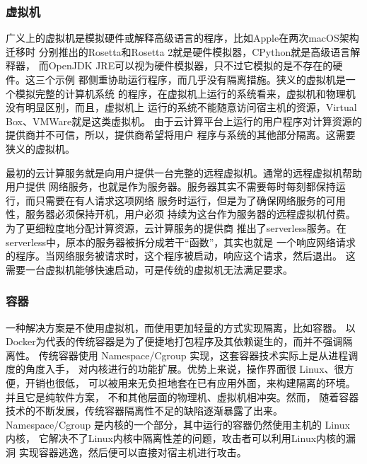 \documentclass{../runikraft-report}
\begin{document}
\subsubsection{虚拟机}
广义上的虚拟机是模拟硬件或解释高级语言的程序，比如Apple在两次macOS架构迁移时
分别推出的Rosetta和Rosetta 2就是硬件模拟器，CPython就是高级语言解释器，
而OpenJDK JRE可以视为硬件模拟器，只不过它模拟的是不存在的硬件。这三个示例
都侧重协助运行程序，而几乎没有隔离措施。狭义的虚拟机是一个模拟完整的计算机系统
的程序，在虚拟机上运行的系统看来，虚拟机和物理机没有明显区别，而且，虚拟机上
运行的系统不能随意访问宿主机的资源，Virtual Box、VMWare就是这类虚拟机。
由于云计算平台上运行的用户程序对计算资源的提供商并不可信，所以，提供商希望将用户
程序与系统的其他部分隔离。这需要狭义的虚拟机。

最初的云计算服务就是向用户提供一台完整的远程虚拟机。通常的远程虚拟机帮助用户提供
网络服务，也就是作为服务器。服务器其实不需要每时每刻都保持运行，而只需要在有人请求这项网络
服务时运行，但是为了确保网络服务的可用性，服务器必须保持开机，用户必须
持续为这台作为服务器的远程虚拟机付费。为了更细粒度地分配计算资源，云计算服务的提供商
推出了serverless服务。在serverless中，原本的服务器被拆分成若干“函数”，其实也就是
一个响应网络请求的程序。当网络服务被请求时，这个程序被启动，响应这个请求，然后退出。
这需要一台虚拟机能够快速启动，可是传统的虚拟机无法满足要求。

\subsubsection{容器}
一种解决方案是不使用虚拟机，而使用更加轻量的方式实现隔离，比如容器。
以Docker为代表的传统容器是为了便捷地打包程序及其依赖诞生的，而并不强调隔离性。
传统容器使用 Namespace/Cgroup 实现，这套容器技术实际上是从进程调度的角度入手，
对内核进行的功能扩展。优势上来说，操作界面很 Linux、很方便，开销也很低，
可以被用来无负担地套在已有应用外面，来构建隔离的环境。并且它是纯软件方案，
不和其他层面的物理机、虚拟机相冲突。然而，
随着容器技术的不断发展，传统容器隔离性不足的缺陷逐渐暴露了出来。
Namespace/Cgroup 是内核的一个部分，其中运行的容器仍然使用主机的 Linux 内核，
它解决不了Linux内核中隔离性差的问题，攻击者可以利用Linux内核的漏洞
实现容器逃逸，然后便可以直接对宿主机进行攻击。\cite{bib:docker-security-selinux}
\end{document}
